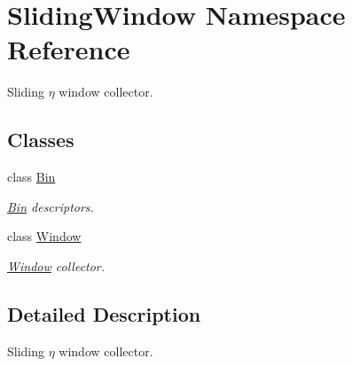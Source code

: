 \hypertarget{namespaceSlidingWindow}{}\section{Sliding\+Window Namespace Reference}
\label{namespaceSlidingWindow}


Sliding $ \eta $ window collector.  


\subsection*{Classes}
\begin{DoxyCompactItemize}
\item 
class \hyperlink{classSlidingWindow_1_1Bin}{Bin}
\begin{DoxyCompactList}\small\item\em \hyperlink{classSlidingWindow_1_1Bin}{Bin} descriptors. \end{DoxyCompactList}\item 
class \hyperlink{classSlidingWindow_1_1Window}{Window}
\begin{DoxyCompactList}\small\item\em \hyperlink{classSlidingWindow_1_1Window}{Window} collector. \end{DoxyCompactList}\end{DoxyCompactItemize}


\subsection{Detailed Description}
Sliding $ \eta $ window collector. 